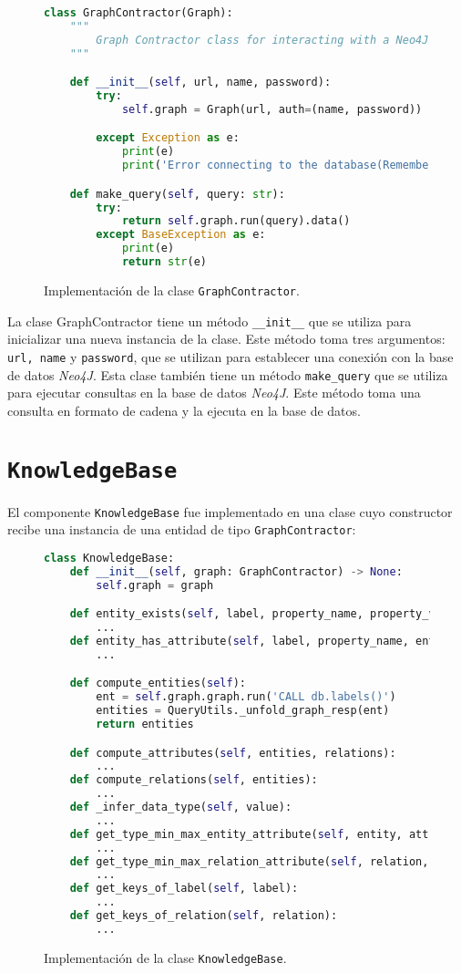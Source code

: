 \begin{figure}[H]
\begin{lstlisting}[language=python]
class GraphContractor(Graph):
    """
        Graph Contractor class for interacting with a Neo4J DB instance
    """

    def __init__(self, url, name, password):
        try:
            self.graph = Graph(url, auth=(name, password))

        except Exception as e:
            print(e)
            print('Error connecting to the database(Remember VPN)')

    def make_query(self, query: str):
        try:
            return self.graph.run(query).data()
        except BaseException as e:
            print(e)
            return str(e)
\end{lstlisting}
\caption{Implementación de la clase \texttt{GraphContractor}.}
\end{figure}

La clase GraphContractor tiene un método \texttt{\_\_init\_\_} que se utiliza para inicializar una nueva instancia de la clase. Este método toma tres argumentos: \texttt{url, name} y \texttt{password}, que se utilizan para establecer una conexión con la base de datos \textit{Neo4J}. Esta clase también tiene un método \texttt{make\_query} que se utiliza para ejecutar consultas en la base de datos \textit{Neo4J}. Este método toma una consulta en formato de cadena y la ejecuta en la base de datos.

\section{\texttt{KnowledgeBase}}

El componente \texttt{KnowledgeBase} fue implementado en una clase cuyo constructor recibe una instancia de una entidad de tipo \texttt{GraphContractor}:

\begin{figure}[H]
\begin{lstlisting}[language=python]
class KnowledgeBase:
	def __init__(self, graph: GraphContractor) -> None:
        self.graph = graph

    def entity_exists(self, label, property_name, property_value):
    	...
	def entity_has_attribute(self, label, property_name, entity_name):
    	...

	def compute_entities(self):
        ent = self.graph.graph.run('CALL db.labels()')
        entities = QueryUtils._unfold_graph_resp(ent)
        return entities

	def compute_attributes(self, entities, relations):
		...
	def compute_relations(self, entities):
		...
	def _infer_data_type(self, value):
		...
	def get_type_min_max_entity_attribute(self, entity, attribute_name):
		...
	def get_type_min_max_relation_attribute(self, relation, attribute_name):
		...
	def get_keys_of_label(self, label):
		...
	def get_keys_of_relation(self, relation):
		...
\end{lstlisting}
\caption{Implementación de la clase \texttt{KnowledgeBase}.}
\label{code:kbimage}
\end{figure}

